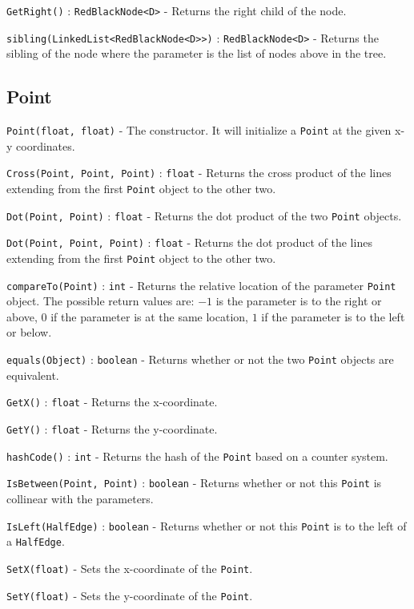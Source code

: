 \documentclass[11pt]{article}
\begin{document}
\texttt{GetRight()} : \texttt{RedBlackNode<D>} - Returns the right child of the node.

\texttt{sibling(LinkedList<RedBlackNode<D>>)} : \texttt{RedBlackNode<D>} - Returns the sibling of the node where the parameter is the list of nodes above in the tree.

\subsection{Point}
\label{sec:point}

\texttt{Point(float, float)} - The constructor. It will initialize a \texttt{Point} at the given x-y coordinates.

\texttt{Cross(Point, Point, Point)} : \texttt{float} - Returns the cross product of the lines extending from the first \texttt{Point} object to the other two.

\texttt{Dot(Point, Point)}  : \texttt{float} - Returns the dot product of the two \texttt{Point} objects.

\texttt{Dot(Point, Point, Point)} : \texttt{float} - Returns the dot product of the lines extending from the first \texttt{Point} object to the other two.

\texttt{compareTo(Point)} : \texttt{int} - Returns the relative location of the parameter \texttt{Point} object. The possible return values are: $-1$ is the parameter is to the right or above, $0$ if the parameter is at the same location, $1$ if the parameter is to the left or below.

\texttt{equals(Object)} : \texttt{boolean} - Returns whether or not the two \texttt{Point} objects are equivalent.

\texttt{GetX()} : \texttt{float} - Returns the x-coordinate.

\texttt{GetY()} : \texttt{float} - Returns the y-coordinate.

\texttt{hashCode()} : \texttt{int} - Returns the hash of the \texttt{Point} based on a counter system.

\texttt{IsBetween(Point, Point)} : \texttt{boolean} - Returns whether or not this \texttt{Point} is collinear with the parameters.

\texttt{IsLeft(HalfEdge)} : \texttt{boolean} - Returns whether or not this \texttt{Point} is to the left of a \texttt{HalfEdge}.

\texttt{SetX(float)} - Sets the x-coordinate of the \texttt{Point}.

\texttt{SetY(float)} - Sets the y-coordinate of the \texttt{Point}.
\end{document}
